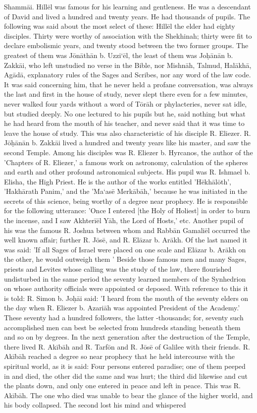 \documentclass[12pt]{article}
\begin{document}
Shammāi. Hillēl was famous for his learning and gentleness. He was a descendant of David and lived a hundred and twenty years. He had thousands of pupils. The following was said about the most select of these: Hillēl the elder had eighty disciples. Thirty were worthy of association with the Shekhinah; thirty were fit to declare embolismic years, and twenty stood between the two former groups. The greatest of them was Jōnāthān b. Uzzi‘ēl, the least of them was Joḥānān b. Zakkāi, who left unstudied no verse in the Bible, nor Mishnāh, Talmud, Halākhā, Agādā, explanatory rules of the Sages and Scribes, nor any word of the law code. It was said concerning him, that he never held a profane conversation, was always the last and first in the house of study, never slept there even for a few minutes, never walked four yards without a word of Tōrāh or phylacteries, never sat idle, but studied deeply. No one lectured to his pupils but he, said nothing but what he had heard from the mouth of his teacher, and never said that it was time to leave the house of study. This was also characteristic of his disciple R. Eliezer. R. Jōḥānān b. Zakkāi lived a hundred and twenty years like his master, and saw the second Temple. Among his disciples was R. Eliezer b. Hyrcanos, the author of the 'Chapters of R. Eliezer,' a famous work on astronomy, calculation of the spheres and earth and other profound astronomical subjects. His pupil was R. Ishmael b. Elisha, the High Priest. He is the author of the works entitled 'Hēkhālōth', 'Hakhārath Panim,' and the 'Ma‘asē Merkābāh,' because he was initiated in the secrets of this science, being worthy of a degree near prophecy. He is responsible for the following utterance: 'Once I entered [the Holy of Holiest] in order to burn the incense, and I saw Akhterīēl Yāh, the Lord of Hosts,' etc. Another pupil of his was the famous R. Joshua between whom and Rabbān Gamaliēl occurred the well known affair; further R. Jōsē, and R. Elāzar b. Arākh. Of the last named it was said: 'If all Sages of Israel were placed on one scale and Elāzar b. Arākh on the other, he would outweigh them ' Beside those famous men and many Sages, priests and Levites whose calling was the study of the law, there flourished undisturbed in the same period the seventy learned members of the Synhedrion on whose authority officials were appointed or deposed. With reference to this it is told: R. Simon b. Joḥāi said: 'I heard from the mouth of the seventy elders on the day when R. Eliezer b. Azariāh was appointed President of the Academy.' These seventy had a hundred followers, the latter -thousands; for, seventy such accomplished men can best be selected from hundreds standing beneath them and so on by degrees. In the next generation after the destruction of the Temple, there lived R. Akībāh and R. Tarfōn and R. Jōsē of Galilee with their friends. R. Akībāh reached a degree so near prophecy that he held intercourse with the spiritual world, as it is said: Four persons entered paradise; one of them peeped in and died, the other did the same and was hurt; the third did likewise and cut the plants down, and only one entered in peace and left in peace. This was R. Akībāh. The one who died was unable to bear the glance of the higher world, and his body collapsed. The second lost his mind and whispered 
\end{document}
